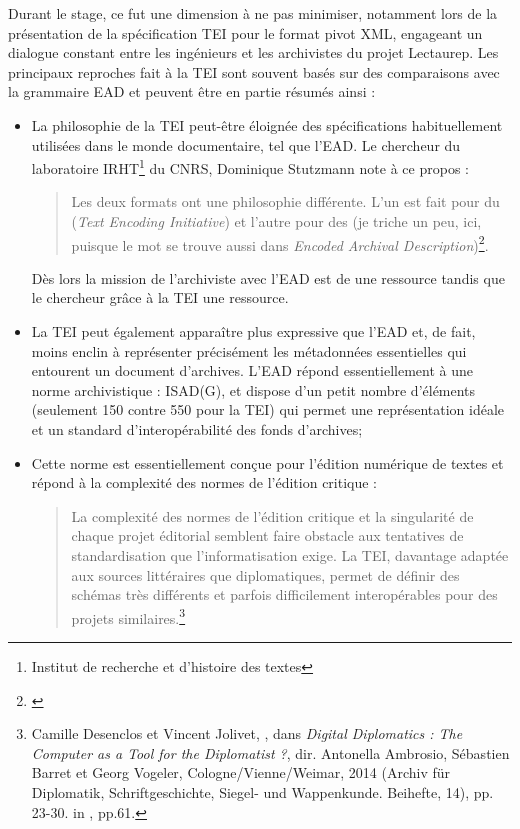 Durant le stage, ce fut une dimension à ne pas minimiser, notamment lors de la présentation de la spécification TEI pour le format pivot XML, engageant un dialogue constant entre les ingénieurs et les archivistes du projet Lectaurep. Les principaux reproches fait à la TEI sont souvent basés sur des comparaisons avec la grammaire EAD et peuvent être en partie résumés ainsi :
\begin{itemize}
    \item La philosophie de la TEI peut-être éloignée des spécifications habituellement utilisées dans le monde documentaire, tel que l'EAD. Le chercheur du laboratoire IRHT\footnote{Institut de recherche et d'histoire des textes} du CNRS, Dominique Stutzmann note à ce propos : 
    \begin{quote}
        Les deux formats ont une philosophie différente. L'un est fait pour  du  
        (\textit{Text Encoding Initiative}) et l'autre pour  des  (je triche un peu, ici, puisque le mot  se trouve aussi dans \textit{Encoded Archival Description})\footnote{\cite{stutzmann_ead-tei_2019}}.
    \end{quote}
    Dès lors la mission de l'archiviste avec l'EAD est de  une ressource tandis que le chercheur grâce à la TEI  une ressource.
    \item La TEI peut également apparaître plus expressive que l'EAD et, de fait, moins enclin à représenter précisément les métadonnées essentielles qui entourent un document d'archives. L'EAD répond essentiellement à une norme archivistique : ISAD(G), et dispose d'un petit nombre d'éléments (seulement 150 contre 550 pour la TEI) qui permet une représentation idéale et un standard d'interopérabilité des fonds d'archives;
    \item Cette norme est essentiellement conçue pour l'édition numérique de textes et répond à la complexité des normes de l'édition critique : 
    \begin{quote}
        La  complexité  des  normes  de  l'édition  critique  et  la  singularité  de  chaque  projet éditorial semblent faire obstacle aux tentatives de standardisation que l'informatisation  exige. La  TEI,
        davantage  adaptée  aux  sources  littéraires  que diplomatiques, permet de définir des schémas très différents et parfois difficilement interopérables pour des projets similaires.\footnote{Camille  Desenclos  et  Vincent  Jolivet,  ,  dans  \textit{Digital  Diplomatics : The Computer as a Tool for the Diplomatist ?},  dir.  Antonella  Ambrosio,  Sébastien  Barret  et  Georg  Vogeler, Cologne/Vienne/Weimar, 2014 (Archiv für Diplomatik, Schriftgeschichte, Siegel- und Wappenkunde. Beihefte, 14), pp. 23-30. in \cite{canteaut_actes_2020}, pp.61.} 
    \end{quote} 
\end{itemize}

